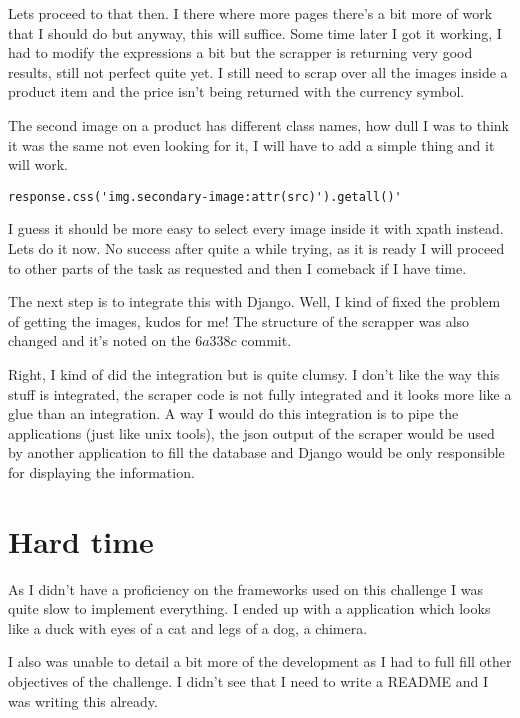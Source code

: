 \documentclass[a4paper, 12pt]{article}
\begin{document}
Lets proceed to that then. I there where more pages there's a bit more of work
that I should do but anyway, this will suffice. Some time later I got it
working, I had to modify the expressions a bit but the scrapper is returning
very good results, still not perfect quite yet. I still need to scrap over all
the images inside a product item and the price isn't being returned with the
currency symbol.

The second image on a product has different class names, how dull I was to think
it was the same not even looking for it, I will have to add a simple thing and
it will work.

\begin{verbatim}
response.css('img.secondary-image:attr(src)').getall()'
\end{verbatim}

I guess it should be more easy to select every image inside it with xpath
instead. Lets do it now. No success after quite a while trying, as it is
ready I will proceed to other parts of the task as requested and then I
comeback if I have time.

The next step is to integrate this with Django. Well, I kind of fixed the
problem of getting the images, kudos for me! The structure of the scrapper
was also changed and it's noted on the \(6a338c\) commit.

Right, I kind of did the integration but is quite clumsy. I don't like the way
this stuff is integrated, the scraper code is not fully integrated and it looks
more like a glue than an integration. A way I would do this integration is to
pipe the applications (just like unix tools), the json output of the scraper
would be used by another application to fill the database and Django would be
only responsible for displaying the information.

\section{Hard time}
\label{sec:orgac88658}

As I didn't have a proficiency on the frameworks used on this challenge I was
quite slow to implement everything. I ended up with a application which looks
like a duck with eyes of a cat and legs of a dog, a chimera.

I also was unable to detail a bit more of the development as I had to full fill
other objectives of the challenge. I didn't see that I need to write a README
and I was writing this already.
\end{document}
